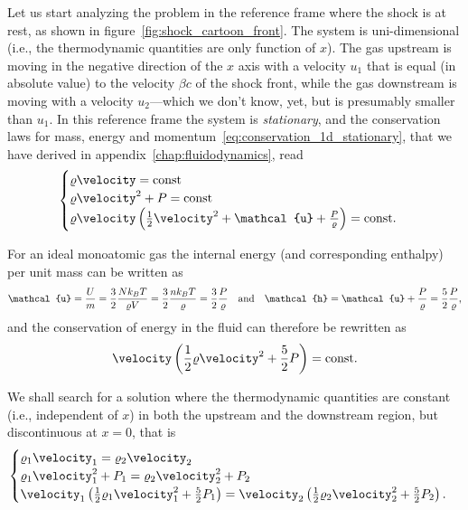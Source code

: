 Let us start analyzing the problem in the reference frame where the shock is at rest,
as shown in figure~\ref{fig:shock_cartoon_front}. The system is uni-dimensional
(i.e., the thermodynamic quantities are only function of $x$). The gas upstream
is moving in the negative direction of the $x$ axis with a velocity $u_1$ that is
equal (in absolute value) to the velocity $\beta c$ of the shock front, while the gas
downstream is moving with a velocity $u_2$---which we don't know, yet, but is presumably
smaller than $u_1$. In this reference frame the system is \emph{stationary}, and
the conservation laws for mass, energy and momentum~\eqref{eq:conservation_1d_stationary},
that we have derived in appendix~\ref{chap:fluidodynamics}, read
\begin{align*}
  \begin{cases}
  \density \velocity = \text{const}\\
  \density \velocity^2 + \pressure = \text{const}\\
  \density \velocity \left( \frac{1}{2}\velocity^2 + \mathcal{u} +
    \frac{\pressure}{\density} \right) = \text{const}.
  \end{cases}
\end{align*}

For an ideal monoatomic gas the internal energy (and corresponding enthalpy) per
unit mass can be written as
\begin{align*}
  \mathcal{u} = \frac{U}{m} = \frac{3}{2} \frac{N\kT}{\density V} =
  \frac{3}{2} \frac{n\kT}{\density} = \frac{3}{2} \frac{\pressure}{\density}
  \quad \text{and} \quad
  \mathcal{h} = \mathcal{u} + \frac{P}{\density} =
  \frac{5}{2} \frac{\pressure}{\density},
\end{align*}
and the conservation of energy in the fluid can therefore be rewritten as
\begin{align*}
  \velocity \left( \frac{1}{2}\density \velocity^2 + \frac{5}{2}\pressure \right)= \text{const}.
\end{align*}

We shall search for a solution where the thermodynamic quantities are constant
(i.e., independent of $x$) in both the upstream and the downstream region, but
discontinuous at $x = 0$, that is
\begin{align}
  \begin{cases}
  \density_1 \velocity_1 =  \density_2 \velocity_2\\
  \density_1 \velocity_1^2 + \pressure_1 = \density_2 \velocity_2^2 + \pressure_2\\
  \velocity_1 \left( \frac{1}{2}\density_1 \velocity_1^2 + \frac{5}{2}\pressure_1 \right) =
  \velocity_2 \left( \frac{1}{2}\density_2 \velocity_2^2 + \frac{5}{2}\pressure_2 \right).
  \end{cases}
\end{align}

